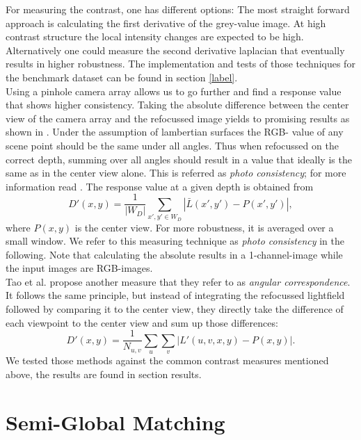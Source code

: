 \documentclass  [
  paper    = a4,
  BCOR     = 10mm,
  twoside,
  fontsize = 12pt,
  fleqn,
  toc      = bibnumbered,
  toc      = listofnumbered,
  numbers  = noendperiod,
  headings = normal,
  listof   = leveldown,
  version  = 3.03
]                                       {scrreprt}
\begin{document}
For measuring the contrast, one has different options: The most straight forward approach is calculating the first derivative of the grey-value image. At high contrast structure the local intensity changes are expected to be high. Alternatively one could measure the second derivative laplacian that eventually results in higher robustness. The implementation and tests of those techniques for the benchmark dataset can be found in section \ref{label}.\\
Using a pinhole camera array allows us to go further and find a response value that shows higher consistency. Taking the absolute difference between the center view of the camera array and the refocussed image yields to promising results as shown in \cite{tao2017shape}. Under the assumption of lambertian surfaces the RGB- value of any scene point should be the same under all angles. Thus when refocussed on the correct depth, summing over all angles should result in a value that ideally is the same as in the center view alone. This is referred as \textit{photo consistency}; for more information read \cite{tao2017shape}.
The response value at a given depth is obtained from
\begin{equation}\label{key}
D'(x,y) = \frac{1}{|W_D|}\sum_{x',y' \in W_D} \left|\bar{L}(x',y')- P(x', y')\right|,
\end{equation}
where $P(x,  y)$ is the center view. For more robustness, it is averaged over a small window. We refer to this measuring technique as \textit{photo consistency} in the following. Note that calculating the absolute results in a 1-channel-image while the input images are RGB-images. \\ Tao et al. propose another measure that they refer to as \textit{angular correspondence}. It follows the same principle, but instead of integrating the refocussed lightfield followed by comparing it to the center view, they directly take the difference of each viewpoint to the center view and sum up those differences:
\begin{equation}\label{eq:responsecorr}
D'(x,y) = \frac{1}{N_{u,v}}\sum_{u}\sum_{v}  \left|L'(u, v, x, y) - P(x,y)\right|.
\end{equation}
We tested those methods against the common contrast measures mentioned above, the results are found in section results.

\section{Semi-Global Matching}
\end{document}
